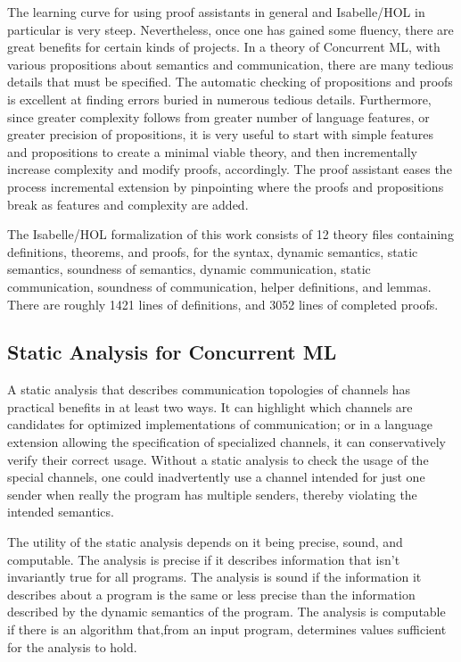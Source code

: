 \documentclass[letterpaper, 11pt]{extarticle}
\begin{document}
The learning curve for using proof assistants in general and Isabelle/HOL in particular is very steep.
Nevertheless, once one has gained some fluency, there are great benefits for certain kinds of projects.
In a theory of Concurrent ML, with various propositions about semantics and communication, there are many
tedious details that must be specified. 
The automatic checking of propositions and proofs is excellent at finding errors buried in numerous tedious details.
Furthermore, since greater complexity follows from greater
number of language features, or greater precision of propositions, it is very useful to start with simple features
and propositions to create a minimal viable theory, and then incrementally increase complexity and modify proofs, accordingly.
The proof assistant eases the process incremental extension by pinpointing where the proofs and propositions break
as features and complexity are added.

The Isabelle/HOL formalization of this work consists of 12 theory files containing definitions, theorems,
and proofs, for the syntax, dynamic semantics, static semantics, soundness of semantics, dynamic communication,
static communication, soundness of communication, helper definitions, and lemmas. 
There are roughly 1421 lines of definitions, and 3052 lines of completed proofs. 

\subsection{Static Analysis for Concurrent ML}
A static analysis that describes communication
topologies of channels has practical benefits in at least two ways. It can highlight which
channels are candidates for optimized implementations of communication; or in a language
extension allowing the specification of specialized channels, it can conservatively verify
their correct usage. Without a static analysis to check the usage of the special channels, one
could inadvertently use a channel intended for just one sender when really the program has multiple senders, 
thereby violating the intended semantics. 

The utility of the static analysis depends on it being precise, sound, and computable. 
The analysis is precise if it describes information that isn't invariantly true for all programs. 
The analysis is sound if the information it describes about a program is the same or less precise than the information 
described by the dynamic semantics of the program. The analysis is computable if there is an algorithm that,from an input program, determines values sufficient for the analysis to hold.
\end{document}
